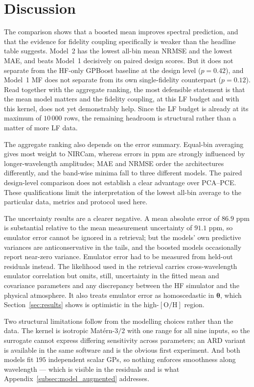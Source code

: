 \documentclass[12pt, letterpaper, oneside]{article}
\begin{document}
\section{Discussion}
\label{sec:disc}

The comparison shows that a boosted mean improves spectral prediction, and
that the evidence for fidelity coupling specifically is weaker than the
headline table suggests. Model~2 has the lowest all-bin mean NRMSE and the
lowest MAE, and beats Model~1 decisively on paired design scores. But it does
not separate from the HF-only GPBoost baseline at the design level
($p=0.42$), and Model~1 MF does not separate from its own single-fidelity
counterpart ($p=0.12$). Read together with the aggregate ranking, the most
defensible statement is that the mean model matters and the fidelity coupling,
at this LF budget and with this kernel, does not yet demonstrably help. Since
the LF budget is already at its maximum of $10\,000$ rows, the remaining
headroom is structural rather than a matter of more LF data.

The aggregate ranking also depends on the error summary. Equal-bin averaging
gives most weight to NIRCam, whereas errors in ppm are strongly influenced by
longer-wavelength amplitudes; MAE and NRMSE order the architectures
differently, and the band-wise minima fall to three different models. The
paired design-level comparison does not establish a clear advantage over
PCA--PCE. These qualifications limit the interpretation of the lowest all-bin
average to the particular data, metrics and protocol used here.

The uncertainty results are a clearer negative. A mean absolute error of
$86.9$ ppm is substantial relative to the mean measurement uncertainty of
$91.1$ ppm, so emulator error cannot be ignored in a retrieval; but the models'
own predictive variances are anticonservative in the tails, and the boosted
models occasionally report near-zero variance. Emulator error had to be
measured from held-out residuals instead. The likelihood used in the retrieval
carries cross-wavelength emulator correlation but omits, still, uncertainty in
the fitted mean and covariance parameters and any discrepancy between the HF
simulator and the physical atmosphere. It also treats emulator error as
homoscedastic in $\bm\theta$, which Section~\ref{sec:results} shows is
optimistic in the high-$[\mathrm{O/H}]$ region.

Two structural limitations follow from the modelling choices rather than the
data. The kernel is isotropic Matérn-$3/2$ with one range for all nine inputs,
so the surrogate cannot express differing sensitivity across parameters; an
ARD variant is available in the same software and is the obvious first
experiment. And both models fit $195$ independent scalar GPs, so nothing
enforces smoothness along wavelength --- which is visible in the residuals and
is what Appendix~\ref{subsec:model_augmented} addresses.
\end{document}
